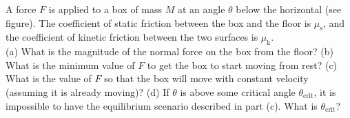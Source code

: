 A force $F$ is applied to a box of mass $M$ at an angle
$\theta$ below the horizontal (see figure). The coefficient of static
friction between the box and the floor is $\mu_\text{s}$, and the
coefficient of kinetic friction between the two surfaces is
$\mu_\text{k}$.\\
%
(a) What is the magnitude of the normal force on the box from the
floor?\answercheck\hwendpart
%
(b) What is the minimum value of $F$ to get the box to
start moving from rest?\answercheck\hwendpart
%
(c) What is the value of $F$ so that the box will move with
constant velocity (assuming it is already moving)?\answercheck\hwendpart
%
(d) If $\theta$ is above some critical angle $\theta_\text{crit}$, it is impossible to have
the equilibrium scenario described in part (c). What is
$\theta_\text{crit}$?\answercheck
